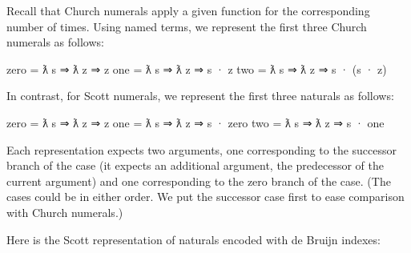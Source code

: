 Recall that Church numerals apply a given function for the corresponding
number of times. Using named terms, we represent the first three Church
numerals as follows:

\begin{myDisplay}
zero  =  ƛ s ⇒ ƛ z ⇒ z
one   =  ƛ s ⇒ ƛ z ⇒ s · z
two   =  ƛ s ⇒ ƛ z ⇒ s · (s · z)
\end{myDisplay}

In contrast, for Scott numerals, we represent the first three naturals
as follows:

\begin{myDisplay}
zero = ƛ s ⇒ ƛ z ⇒ z
one  = ƛ s ⇒ ƛ z ⇒ s · zero
two  = ƛ s ⇒ ƛ z ⇒ s · one
\end{myDisplay}

Each representation expects two arguments, one corresponding to the
successor branch of the case (it expects an additional argument, the
predecessor of the current argument) and one corresponding to the zero
branch of the case. (The cases could be in either order. We put the
successor case first to ease comparison with Church numerals.)

Here is the Scott representation of naturals encoded with de Bruijn
indexes:

